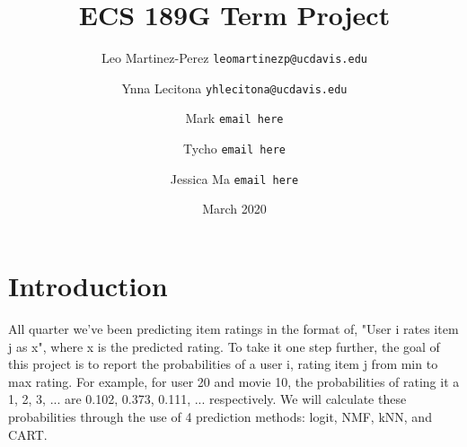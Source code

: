 \documentclass{article}
\title{ECS 189G Term Project}
\author{Leo Martinez-Perez
    \texttt{leomartinezp@ucdavis.edu}
    \and Ynna Lecitona
    \texttt{yhlecitona@ucdavis.edu}
    \and Mark
    \texttt{email here}
    \and Tycho
    \texttt{email here}
    \and Jessica Ma
    \texttt{email here}
}
\date{March 2020}
\begin{document}
\maketitle

\section{Introduction}
All quarter we've been predicting item ratings in the format of, "User i rates item j as x",
where x is the predicted rating. To take it one step further, the goal of this project is to report the probabilities
of a user i, rating item j from min to max rating. For example, for user 20 and movie 10, the probabilities of rating it a
1, 2, 3, ... are 0.102, 0.373, 0.111, ... respectively. We will calculate these probabilities through the use of 4 prediction methods:
logit, NMF, kNN, and CART.
\end{document}
